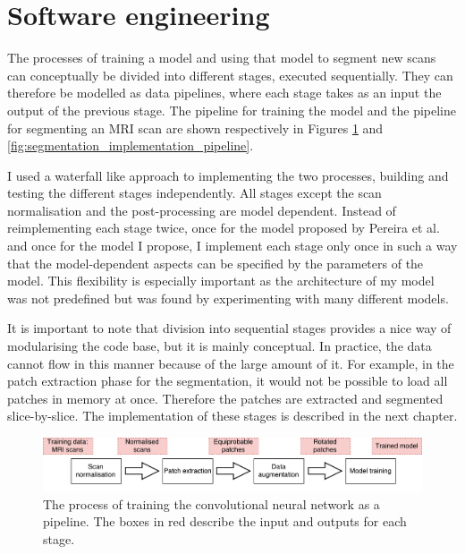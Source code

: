 \documentclass[12pt,a4paper,twoside,openright]{report}
\begin{document}
\section{Software engineering}
The processes of training a model and using that model to segment new scans can conceptually be divided into different stages, executed sequentially. They can therefore be modelled as data pipelines, where each stage takes as an input the output of the previous stage. The pipeline for training the model and the pipeline for segmenting an MRI scan are shown respectively in Figures \ref{fig:training_implementation_pipeline} and \ref{fig:segmentation_implementation_pipeline}.

I used a waterfall like approach to implementing the two processes, building and testing the different stages independently. All stages except the scan normalisation and the post-processing are model dependent. Instead of reimplementing each stage twice, once for the model proposed by Pereira et al. and once for the model I propose, I implement each stage only once in such a way that the model-dependent aspects can be specified by the parameters of the model. This flexibility is especially important as the architecture of my model was not predefined but was found by experimenting with many different models.

It is important to note that division into sequential stages provides a nice way of modularising the code base, but it is mainly conceptual. In practice, the data cannot flow in this manner because of the large amount of it. For example, in the patch extraction phase for the segmentation, it would not be possible to load all patches in memory at once. Therefore the patches are extracted and segmented slice-by-slice. The implementation of these stages is described in the next chapter.

\begin{figure}
	\centering
	\includegraphics[width=\textwidth]{training_implementation_pipeline}
	\caption[The process of training the convolutional neural network as a pipeline]{The process of training the convolutional neural network as a pipeline. The boxes in red describe the input and outputs for each stage.}
	\label{fig:training_implementation_pipeline}
\end{figure}
\end{document}
